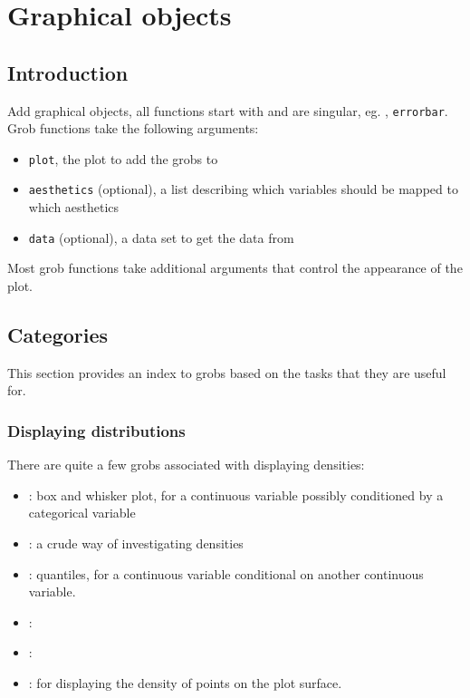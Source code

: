 


\chapter{Graphical objects}

\section{Introduction}\label{sec:introduction}

Add graphical objects, all functions start with  and are singular, eg. , {\tt errorbar}.  Grob functions take the following arguments:

\begin{itemize}
	\item {\tt plot}, the plot to add the grobs to 
	\item {\tt aesthetics} (optional), a list describing which variables should be mapped to which aesthetics
	\item {\tt data} (optional), a data set to get the data from
\end{itemize}

Most grob functions take additional arguments that control the appearance of the plot.  

\section{Categories}\label{sec:categories}

This section provides an index to grobs based on the tasks that they are useful for.

\subsection{Displaying distributions}\label{sec:distributions}

There are quite a few grobs associated with displaying densities:

\begin{itemize}
	\item {}: box and whisker plot, for a continuous variable possibly conditioned by a categorical variable
	\item {}: a crude way of investigating densities
	\item {}: quantiles, for a continuous variable conditional on another continuous variable.
	\item {}: 
	\item {}: 
	\item {}: for displaying the density of points on the plot surface.
\end{itemize}


